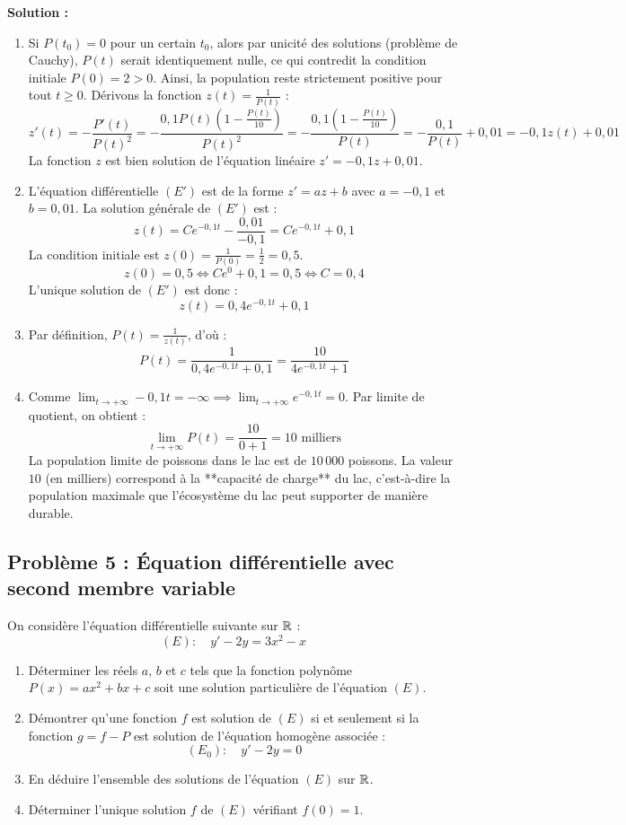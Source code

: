 \textbf{Solution :}
\begin{enumerate}
    \item Si $P(t_0) = 0$ pour un certain $t_0$, alors par unicité des solutions (problème de Cauchy), $P(t)$ serait identiquement nulle, ce qui contredit la condition initiale $P(0) = 2 > 0$. Ainsi, la population reste strictement positive pour tout $t \ge 0$.
    Dérivons la fonction $z(t) = \frac{1}{P(t)}$ :
    \[
    z'(t) = -\frac{P'(t)}{P(t)^2} = -\frac{0,1 P(t) \left( 1 - \frac{P(t)}{10} \right)}{P(t)^2} = - \frac{0,1 \left(1 - \frac{P(t)}{10}\right)}{P(t)} = -\frac{0,1}{P(t)} + 0,01 = -0,1 z(t) + 0,01
    \]
    La fonction $z$ est bien solution de l'équation linéaire $z' = -0,1z + 0,01$.
    
    \item L'équation différentielle $(E')$ est de la forme $z' = az+b$ avec $a = -0,1$ et $b = 0,01$.
    La solution générale de $(E')$ est :
    \[
    z(t) = C e^{-0,1t} - \frac{0,01}{-0,1} = C e^{-0,1t} + 0,1
    \]
    La condition initiale est $z(0) = \frac{1}{P(0)} = \frac{1}{2} = 0,5$.
    \[
    z(0) = 0,5 \iff C e^{0} + 0,1 = 0,5 \iff C = 0,4
    \]
    L'unique solution de $(E')$ est donc :
    \[
    z(t) = 0,4 e^{-0,1t} + 0,1
    \]
    
    \item Par définition, $P(t) = \frac{1}{z(t)}$, d'où :
    \[
    P(t) = \frac{1}{0,4 e^{-0,1t} + 0,1} = \frac{10}{4e^{-0,1t} + 1}
    \]
    
    \item Comme $\lim_{t \to +\infty} -0,1t = -\infty \implies \lim_{t \to +\infty} e^{-0,1t} = 0$.
    Par limite de quotient, on obtient :
    \[
    \lim_{t \to +\infty} P(t) = \frac{10}{0 + 1} = 10 \text{ milliers}
    \]
    La population limite de poissons dans le lac est de $10\,000$ poissons. La valeur $10$ (en milliers) correspond à la **capacité de charge** du lac, c'est-à-dire la population maximale que l'écosystème du lac peut supporter de manière durable.
\end{enumerate}

\subsection*{Problème 5 : Équation différentielle avec second membre variable}
On considère l'équation différentielle suivante sur $\mathbb{R}$ :
\[
(E) : \quad y' - 2y = 3x^2 - x
\]
\begin{enumerate}
    \item Déterminer les réels $a$, $b$ et $c$ tels que la fonction polynôme $P(x) = ax^2 + bx + c$ soit une solution particulière de l'équation $(E)$.
    \item Démontrer qu'une fonction $f$ est solution de $(E)$ si et seulement si la fonction $g = f - P$ est solution de l'équation homogène associée :
    \[
    (E_0) : \quad y' - 2y = 0
    \]
    \item En déduire l'ensemble des solutions de l'équation $(E)$ sur $\mathbb{R}$.
    \item Déterminer l'unique solution $f$ de $(E)$ vérifiant $f(0) = 1$.
\end{enumerate}


